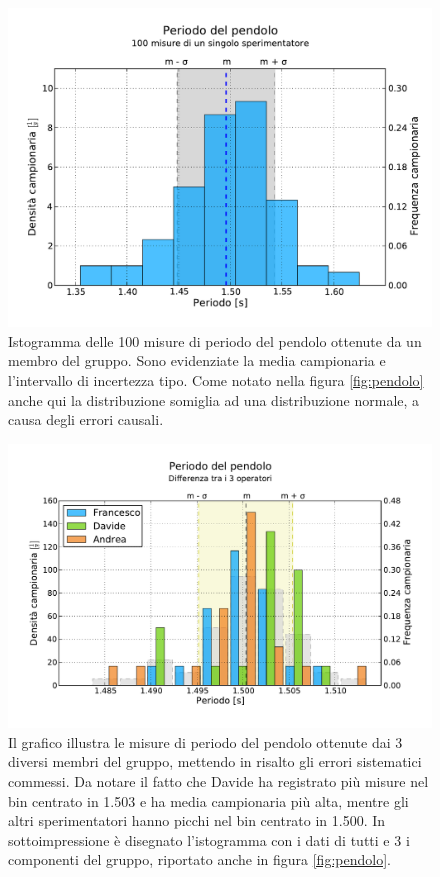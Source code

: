 \begin{figure}[p]
	\centering
	\includegraphics[width=120mm]{grafici/Pendolo100.pdf}
	\caption{Istogramma delle 100 misure di periodo del pendolo ottenute
        da un membro del gruppo. Sono evidenziate la media campionaria
        e l'intervallo di incertezza tipo. Come notato nella figura \ref{fig:pendolo}
        anche qui la distribuzione somiglia ad una distribuzione normale,
        a causa degli errori causali.}
    \label{fig:pendolo100}
\end{figure}

\begin{figure}[bt]
	\centering
	\includegraphics[width=150mm]{grafici/pendolo3.pdf}
	\caption{Il grafico illustra le misure di periodo del pendolo ottenute
        dai 3 diversi membri del gruppo, mettendo in risalto gli errori
        sistematici commessi. Da notare il fatto che Davide ha registrato più
        misure nel bin centrato in 1.503 e ha media campionaria più alta, mentre gli
        altri sperimentatori hanno picchi nel bin centrato in 1.500. In sottoimpressione
        è disegnato l'istogramma con i dati di tutti e 3 i componenti del gruppo, riportato
        anche in figura \ref{fig:pendolo}.}
    \label{fig:pendolo3}
\end{figure}


